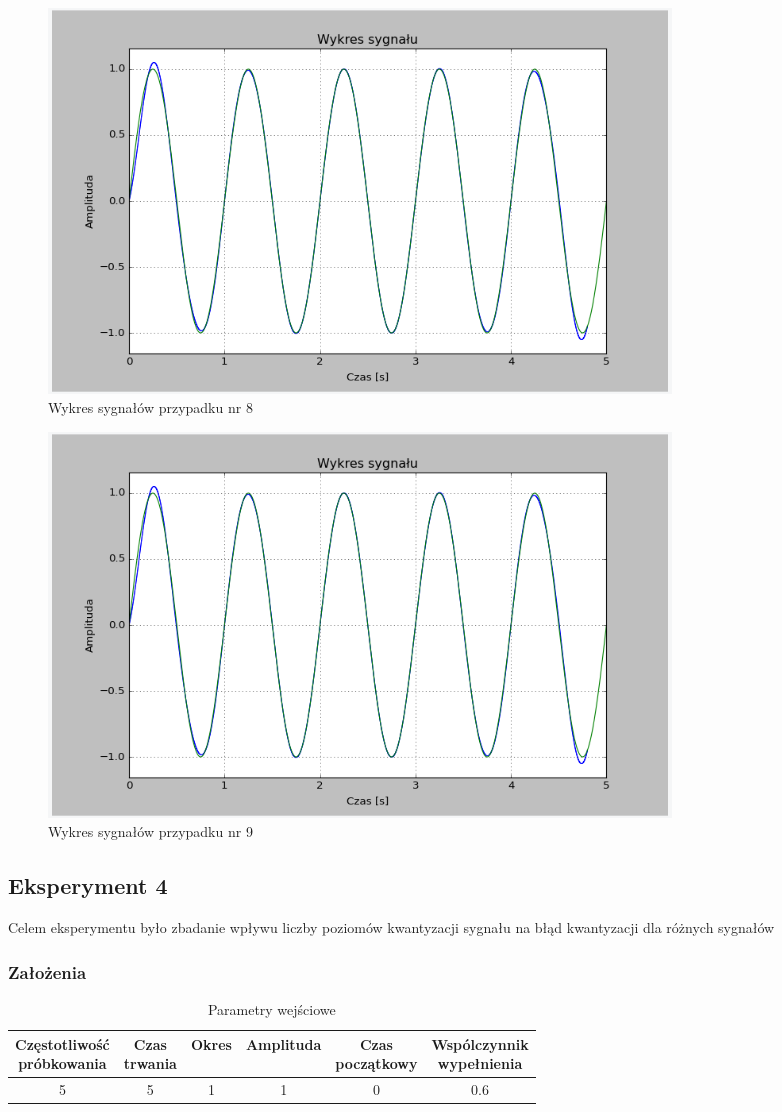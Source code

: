 \documentclass{article}
\begin{document}
    \begin{figure}[h!]
        \centering
        \includegraphics[width=0.8\textwidth]{img/1/sinc25.png}
        \caption{Wykres sygnałów przypadku nr 8}
    \end{figure}
    \FloatBarrier

    \begin{figure}[h!]
        \centering
        \includegraphics[width=0.8\textwidth]{img/1/sinc25.png}
        \caption{Wykres sygnałów przypadku nr 9}
    \end{figure}
    \FloatBarrier
    \subsection{Eksperyment 4}
    Celem eksperymentu było zbadanie wpływu liczby poziomów kwantyzacji sygnału na błąd
    kwantyzacji dla różnych sygnałów

    \subsubsection{Założenia}
    \begin{table}[h!]
        \centering
        \begin{tabular}{|c|c|c|c|c|c|}
            \hline
            \shortstack{Częstotliwość\\ próbkowania} & \shortstack{Czas\\ trwania} & Okres & Amplituda & \shortstack{Czas\\ początkowy} & \shortstack{Wspólczynnik\\ wypełnienia}   \\ \hline
            5 & 5 & 1 & 1 & 0 & 0.6  \\ \hline
        \end{tabular}
        \caption{Parametry wejściowe}
    \end{table}
    
\end{document}

